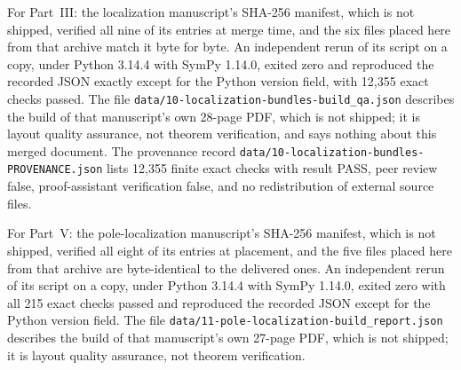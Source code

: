 \documentclass[11pt,letterpaper]{article}
\theoremstyle{definition}
\theoremstyle{remark}
\numberwithin{equation}{section}
\begin{document}
For Part~III: the localization manuscript's SHA-256 manifest, which is not
shipped, verified all nine of its entries at merge time, and the six files
placed here from that archive match it byte for byte. An independent rerun of
its script on a copy, under Python 3.14.4 with SymPy 1.14.0, exited zero and
reproduced the recorded JSON exactly except for the Python version field, with
12{,}355 exact checks passed. The file
\nolinkurl{data/10-localization-bundles-build_qa.json} describes the build of
that manuscript's own 28-page PDF, which is not shipped; it is layout quality
assurance, not theorem verification, and says nothing about this merged
document. The provenance record
\nolinkurl{data/10-localization-bundles-PROVENANCE.json} lists 12{,}355 finite
exact checks with result PASS, peer review false, proof-assistant verification
false, and no redistribution of external source files.

For Part~V: the pole-localization manuscript's SHA-256 manifest, which is not
shipped, verified all eight of its entries at placement, and the five files
placed here from that archive are byte-identical to the delivered ones. An
independent rerun of its script on a copy, under Python 3.14.4 with SymPy
1.14.0, exited zero with all 215 exact checks passed and reproduced the
recorded JSON except for the Python version field. The file
\nolinkurl{data/11-pole-localization-build_report.json} describes the build of
that manuscript's own 27-page PDF, which is not shipped; it is layout quality
assurance, not theorem verification.
\end{document}
